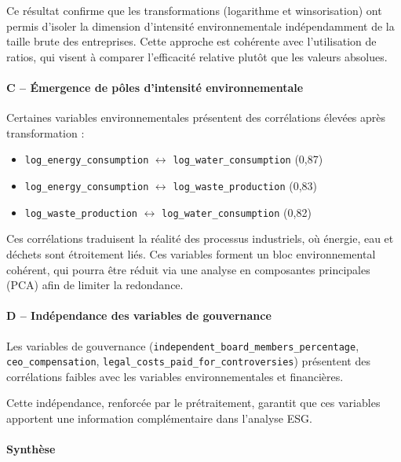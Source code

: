 Ce résultat confirme que les transformations (logarithme et winsorisation) ont permis d’isoler la dimension d’intensité environnementale indépendamment de la taille brute des entreprises. Cette approche est cohérente avec l’utilisation de ratios, qui visent à comparer l’efficacité relative plutôt que les valeurs absolues.

\paragraph{C -- Émergence de pôles d’intensité environnementale}

Certaines variables environnementales présentent des corrélations élevées après transformation :

\begin{itemize}
    \item \texttt{log\_energy\_consumption} $\leftrightarrow$ \texttt{log\_water\_consumption} (0,87)
    \item \texttt{log\_energy\_consumption} $\leftrightarrow$ \texttt{log\_waste\_production} (0,83)
    \item \texttt{log\_waste\_production} $\leftrightarrow$ \texttt{log\_water\_consumption} (0,82)
\end{itemize}

Ces corrélations traduisent la réalité des processus industriels, où énergie, eau et déchets sont étroitement liés. Ces variables forment un bloc environnemental cohérent, qui pourra être réduit via une analyse en composantes principales (PCA) afin de limiter la redondance.

\paragraph{D -- Indépendance des variables de gouvernance}

Les variables de gouvernance (\texttt{independent\_board\_members\_percentage}, \texttt{ceo\_compensation}, \texttt{legal\_costs\_paid\_for\_controversies}) présentent des corrélations faibles avec les variables environnementales et financières.

Cette indépendance, renforcée par le prétraitement, garantit que ces variables apportent une information complémentaire dans l’analyse ESG.

\paragraph{Synthèse}

